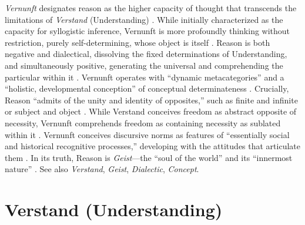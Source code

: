 \documentclass{book}
\begin{document}
\textit{Vernunft} designates reason as the higher capacity of thought that transcends the limitations of \textit{Verstand} (Understanding) \parencite{hegel_georg_2010}. While initially characterized as the capacity for syllogistic inference, Vernunft is more profoundly thinking without restriction, purely self-determining, whose object is itself \parencite[para. 2]{hegel_georg_2010}. Reason is both negative and dialectical, dissolving the fixed determinations of Understanding, and simultaneously positive, generating the universal and comprehending the particular within it \parencite[para. 81--82]{hegel_georg_2010}. Vernunft operates with ``dynamic metacategories'' and a ``holistic, developmental conception'' of conceptual determinateness \parencite[112--113]{Brandom:2019aa}. Crucially, Reason ``admits of the unity and identity of opposites,'' such as finite and infinite or subject and object \parencite[50]{Brandom:2019aa}. While Verstand conceives freedom as abstract opposite of necessity, Vernunft comprehends freedom as containing necessity as sublated within it \parencite[para. 181A]{hegel_georg_2010}. Vernunft conceives discursive norms as features of ``essentially social and historical recognitive processes,'' developing with the attitudes that articulate them \parencite{Brandom:2019aa}. In its truth, Reason is \textit{Geist}---the ``soul of the world'' and its ``innermost nature'' \parencite[para. 82, 439]{hegel_georg_2010}. See also \textit{Verstand}, \textit{Geist}, \textit{Dialectic}, \textit{Concept}.

\section{Verstand (Understanding)}
\end{document}
